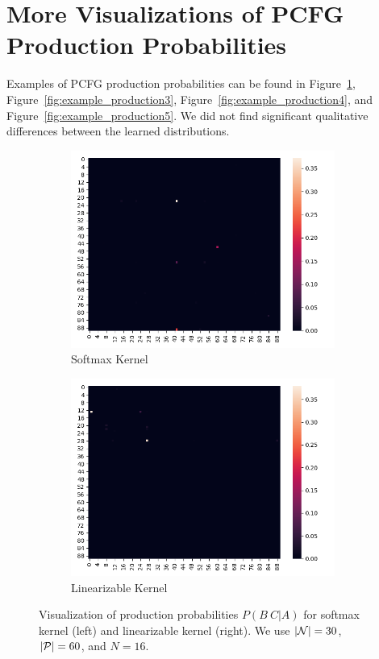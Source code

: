 \documentclass{article}
\begin{document}



\newpage
\appendix

\section{\label{sec:pcfgvismore}More Visualizations of PCFG Production Probabilities}
Examples of PCFG production probabilities can be found in Figure~\ref{fig:example_production2}, Figure~\ref{fig:example_production3}, Figure~\ref{fig:example_production4}, and Figure~\ref{fig:example_production5}. We did not find significant qualitative differences between the learned distributions.

\begin{figure}[!htp]
  \centering
  \begin{subfigure}[t]{0.45\textwidth}
  \centering
  \includegraphics[width=0.95\textwidth]{imgs/softmax/22_exp.png}
  \caption{Softmax Kernel}
  \end{subfigure}
  \begin{subfigure}[t]{0.45\textwidth}
  \centering
  \includegraphics[width=0.95\textwidth]{imgs/rff/22_exp.png}
  \caption{Linearizable Kernel}
  \end{subfigure}
  \caption{\label{fig:example_production2}Visualization of production probabilities $P(B\ C|A)$ for softmax kernel (left) and linearizable kernel (right). We use $|\mathcal{N}|=30$, $|\mathcal{P}|=60$, and $N=16$.}
\end{figure}
\end{document}
